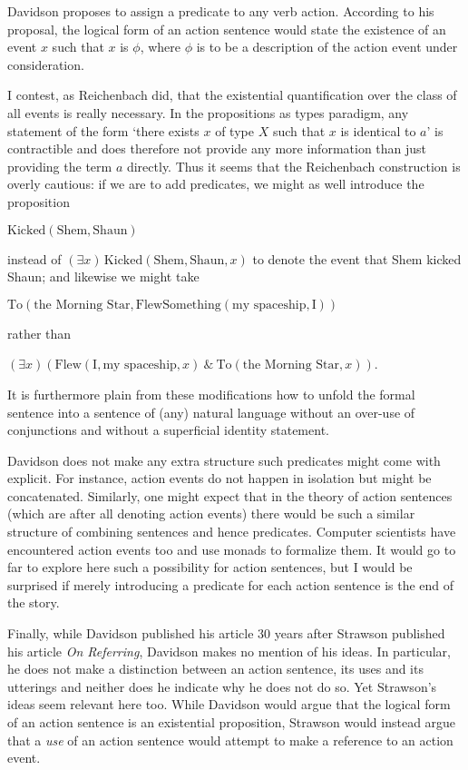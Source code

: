 \documentclass{article}
\begin{document}
Davidson proposes to assign a predicate to any verb action. According to his
proposal, the logical
form of an action sentence would state the existence of an event $x$ such that
$x$ is $\phi$, where $\phi$ is to be a description of the action event under
consideration. 

I contest, as Reichenbach did, that the existential quantification over the class of all events is 
really necessary. In the propositions as types paradigm, any statement of the 
form `there exists $x$ of type $X$ such that $x$ is identical to $a$' is
contractible and does therefore not provide any more information than just 
providing the term $a$ directly. Thus it seems that the Reichenbach construction
is overly cautious: if we are to add predicates, we might as well introduce the
proposition
\begin{center}
$\text{Kicked}(\text{Shem},\text{Shaun})$
\end{center}
instead of $(\exists x)\,\text{Kicked}(\text{Shem},\text{Shaun},x)$ to denote the event that
Shem kicked Shaun; and likewise we might take
\begin{center}
$\text{To}(\text{the Morning Star},
\text{FlewSomething}(\text{my spaceship},\text{I}))$
\end{center}
rather than
\begin{center}
$(\exists x) (\text{Flew}(\text{I},\text{my spaceship},x)\ \&\ \text{To}(\text{the
Morning Star},x))$.
\end{center}
It is furthermore plain from these modifications how to unfold the formal
sentence into a sentence of (any) natural language without an over-use of
conjunctions and without a superficial identity statement.

Davidson does not make any extra structure such predicates might come with 
explicit. For instance, action events do not happen in isolation but might be 
concatenated. Similarly,
one might expect that in the theory of action sentences (which are after all
denoting action events) there would be such a similar structure of combining
sentences and hence predicates. Computer scientists have encountered action 
events too and use monads to formalize them. It would go to far to explore here
such a possibility for action sentences, but I would be surprised if merely
introducing a predicate for each action sentence is the end of the story.

Finally, while Davidson published his article 30 years after Strawson published
his article \emph{On Referring}, Davidson makes no mention of his ideas. In
particular, he does not make a distinction between an action sentence, its uses
and its utterings and neither does he indicate why he does not do so. Yet
Strawson's ideas seem relevant here too. While Davidson would argue that the
logical form of an action sentence is an existential proposition, Strawson would
instead argue that a \emph{use} of an action sentence would attempt to make a
reference to an action event.
\end{document}
